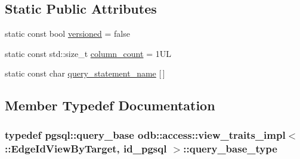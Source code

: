 \subsection*{Static Public Attributes}
\begin{DoxyCompactItemize}
\item 
static const bool \hyperlink{classodb_1_1access_1_1view__traits__impl_3_01_1_1_edge_id_view_by_target_00_01id__pgsql_01_4_ae3fafc6645466be4c37e23461f7520ba}{versioned} = false
\item 
static const std\+::size\+\_\+t \hyperlink{classodb_1_1access_1_1view__traits__impl_3_01_1_1_edge_id_view_by_target_00_01id__pgsql_01_4_ae060865ebbdddfe93f52da126f06cab8}{column\+\_\+count} = 1\+U\+L
\item 
static const char \hyperlink{classodb_1_1access_1_1view__traits__impl_3_01_1_1_edge_id_view_by_target_00_01id__pgsql_01_4_a7289178c7adba776c5e83ac4e2157572}{query\+\_\+statement\+\_\+name} \mbox{[}$\,$\mbox{]}
\end{DoxyCompactItemize}


\subsection{Member Typedef Documentation}
\hypertarget{classodb_1_1access_1_1view__traits__impl_3_01_1_1_edge_id_view_by_target_00_01id__pgsql_01_4_a44eb78f133d084693b0fa0aeef785887}{}
\subsubsection[{query\+\_\+base\+\_\+type}]{\setlength{\rightskip}{0pt plus 5cm}typedef pgsql\+::query\+\_\+base odb\+::access\+::view\+\_\+traits\+\_\+impl$<$ \+::{\bf Edge\+Id\+View\+By\+Target}, id\+\_\+pgsql $>$\+::{\bf query\+\_\+base\+\_\+type}}\label{classodb_1_1access_1_1view__traits__impl_3_01_1_1_edge_id_view_by_target_00_01id__pgsql_01_4_a44eb78f133d084693b0fa0aeef785887}
\hypertarget{classodb_1_1access_1_1view__traits__impl_3_01_1_1_edge_id_view_by_target_00_01id__pgsql_01_4_a2bb409f4a06c6a8bb714bfd9001b6737}{}
